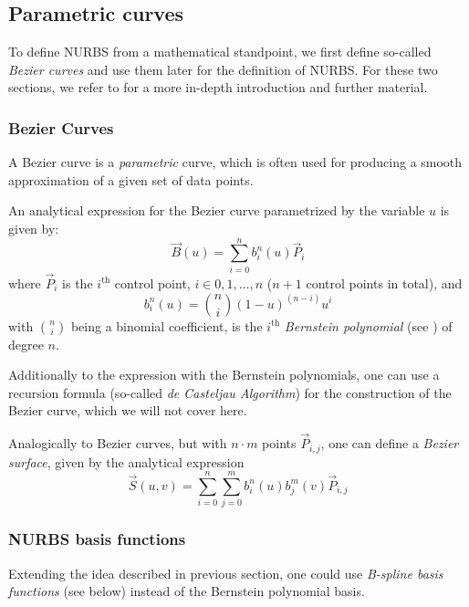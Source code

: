 \subsection{Parametric curves}

To define NURBS from a mathematical standpoint, we first define so-called \emph{Bezier curves} and use them later for the definition of NURBS. For these two sections, we refer to \cite{farin2002handbook} for a more in-depth introduction and further material. 
\subsubsection{Bezier Curves}
A Bezier curve is a \textit{parametric} curve, which is often used for producing a smooth approximation of a given set of data points.
 
An analytical expression for the Bezier curve parametrized by the variable $u$ is given by:
\begin{equation*}
\vec{B}(u)=\sum\limits_{i=0}^n b_i^n(u) \vec{P}_i
\end{equation*}
where $\vec{P}_i$ is the $i^{\text{th}}$ control point, $i\in0,1, \dots ,n$ ($n+1$ control points in total), and
\begin{equation*}
b_i^n(u)=\binom{n}{i}(1-u)^{(n-i)}u^i
\end{equation*}
with $\binom{n}{i}$ being a binomial coefficient, is the $i^{\text{th}}$ \emph{Bernstein polynomial} (see \cite{lorentz2012bernstein}) of degree $n$.

Additionally to the expression with the Bernstein polynomials, one can use a recursion formula (so-called \emph{de Casteljau Algorithm}) for the construction of the Bezier curve, which we will not cover here.

Analogically to Bezier curves, but with $n\cdot m$ points $\vec{P}_{i,j}$,
one can define a \textit{Bezier surface}, given by the analytical expression
\begin{equation*}
\vec{S}(u,v)=\sum\limits_{i=0}^n \sum\limits_{j=0}^m b_i^n(u) b_j^m(v) \vec{P}_{i,j}
\end{equation*}

\subsubsection{NURBS basis functions}
Extending the idea described in previous section, one could use \emph{B-spline basis functions} (see below) instead of the Bernstein polynomial basis.

